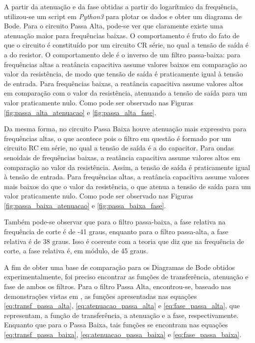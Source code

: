 \documentclass{article}
\begin{document}
A partir da atenuação e da fase obtidas a partir do logarítmico da frequência, utilizou-se um script em \emph{Python3} para plotar os dados e obter um diagrama de Bode. Para o circuito Passa Alta, pode-se ver que claramente existe uma atenuação maior para frequências baixas. O comportamento é fruto do fato de que o circuito é constituído por um circuito CR série, no qual a tensão de saída é a do resistor. O comportamento dele é o inverso de um filtro passa-baixa: para frequências altas a reatância capacitiva assume valores baixos em comparação ao valor da resistência, de modo que tensão de saída é praticamente igual à tensão de entrada. Para frequências baixas, a reatância capacitiva assume valores altos em comparação com o valor da resistência, atenuando a tensão de saída para um valor praticamente nulo. Como pode ser observado nas Figuras \ref{fig:passa_alta_atenuacao} e \ref{fig:passa_alta_fase}.

Da mesma forma, no circuito Passa Baixa houve atenuação mais expressiva para frequências altas, o que acontece pois o filtro em questão é formado por um circuito RC em série, no qual a tensão de saída é a do capacitor. Para ondas senoidais de frequências baixas, a reatância capacitiva assume valores altos em comparação ao valor da resistência. Assim, a tensão de saída é praticamente igual à tensão de entrada. Para frequências altas, a reatância capacitiva assume valores mais baixos do que o valor da resistência, o que atenua a tensão de saída para um valor praticamente nulo. Como pode ser observado nas Figuras \ref{fig:passa_baixa_atenuacao} e \ref{fig:passa_baixa_fase}.

Também pode-se observar que para o filtro passa-baixa, a fase relativa na frequência de corte é de -41 graus, enquanto para o filtro passa-alta, a fase relativa é de 38 graus. Isso é coerente com a teoria que diz que na frequência de corte, a fase relativa é, em módulo, de 45 graus. 

A fim de obter uma base de comparação para os Diagramas de Bode obtidos experimentalmente, foi preciso encontrar as funções de transferência, atenuação e fase de ambos os filtros. Para o filtro Passa Alta, encontrou-se, baseado nas demonstrações vistas em \cite{Sedra2004}, as funções apresentadas nas equações \ref{eq:transf_passa_alta}, \ref{eq:atenuacao_passa_alta} e \ref{eq:fase_passa_alta}, que representam, a função de transferência, a atenuação e a fase, respectivamente. Enquanto que para o Passa Baixa, tais funções se encontram nas equações \ref{eq:transf_passa_baixa}, \ref{eq:atenuacao_passa_baixa} e \ref{eq:fase_passa_baixa}.
\end{document}
